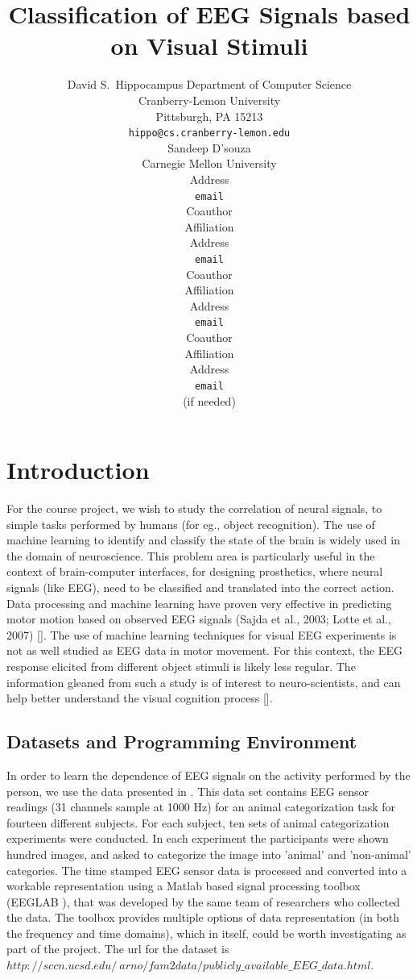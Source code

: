 \documentclass{article} %
\title{Classification of EEG Signals based on Visual Stimuli}
\author{
David S.~Hippocampus
Department of Computer Science\\
Cranberry-Lemon University\\
Pittsburgh, PA 15213 \\
\texttt{hippo@cs.cranberry-lemon.edu} \\
\And
Sandeep D'souza \\
Carnegie Mellon University \\
Address \\
\texttt{email} \\
\And
Coauthor \\
Affiliation \\
Address \\
\texttt{email} \\
\And
Coauthor \\
Affiliation \\
Address \\
\texttt{email} \\
\And
Coauthor \\
Affiliation \\
Address \\
\texttt{email} \\
(if needed)\\
}
\begin{document}
\newcommand{\quotes}[1]{``#1''}

\maketitle


\section{Introduction}

For the course project, we wish to study the correlation of neural signals, to simple tasks performed by humans (for eg., object recognition). The use of machine learning to identify and classify the state of the brain is widely used in the domain of neuroscience. This problem area is particularly useful in the context of brain-computer interfaces, for designing prosthetics, where neural signals (like EEG), need to be classified and translated into the correct action.  Data processing and machine learning have proven very effective in predicting motor motion based on observed EEG signals (Sajda et al., 2003; Lotte et al., 2007) []. The use of machine learning techniques for visual EEG experiments is not as well studied as EEG data in motor movement. For this context, the  EEG response elicited from different object stimuli is likely less regular. The information gleaned from such a study is of interest to neuro-scientists, and can help better understand the visual cognition process [].

\subsection{Datasets and Programming Environment}

In order to learn the dependence of EEG signals on the activity performed by the person, we use the data presented in \cite{eeglab}. This data set contains EEG sensor readings (31 channels sample at 1000 Hz) for an animal categorization task for fourteen different subjects. For each subject, ten sets of animal categorization experiments were conducted. In each experiment the participants were shown hundred images, and asked to categorize the image into 'animal' and 'non-animal' categories. The time stamped EEG sensor data is processed and converted into a workable representation using a Matlab based signal processing toolbox (EEGLAB \cite{eeglab}), that was developed by the same team of researchers who collected the data. The toolbox provides multiple options of data representation (in both the frequency and time domains), which in itself, could be worth investigating as part of the project. The url for the dataset is  $http://sccn.ucsd.edu/~arno/fam2data/publicly\_available\_EEG\_data.html$.
\end{document}
